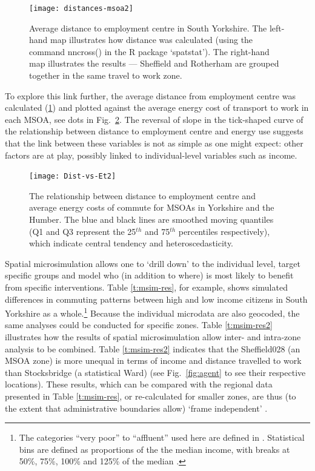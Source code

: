 \begin{figure}
\begin{center}
  \texttt{[image: distances-msoa2]}
\end{center}
\caption[Average distance to employment centre in South Yorkshire]{Average
distance to employment centre in South Yorkshire. The
left-hand map illustrates how distance was calculated (using the command
 nncross() in the R package `spatstat'). The right-hand map illustrates
the results --- Sheffield and Rotherham are grouped together in the same
travel to work zone.}
\label{fig:dis-msoa}
\end{figure}

To explore this link further, the average distance from employment
centre
was calculated (\ref{fig:dis-msoa})
and plotted against the average energy cost of transport to work in each MSOA,
see dots in Fig.~\ref{fig:dis-e}. The reversal of slope in the
tick-shaped curve of the relationship between distance to employment centre and
energy use suggests that the link between these variables is not as simple as
one might expect: other factors are at play, possibly linked to
individual-level variables such as income.

\begin{figure}[h*]
 \centering
\texttt{[image: Dist-vs-Et2]}
 \caption[Scatter plot of distance vs energy costs in Yorkshire and the Humber]
 {The relationship between distance to employment centre and average
energy costs of commute for MSOAs in Yorkshire and the Humber. The blue and
black lines are smoothed moving quantiles (Q1 and Q3 represent the 25$^{th}$ and 75$^{th}$
percentiles respectively), which indicate central tendency and heteroscedasticity.}
 \label{fig:dis-e}
\end{figure}

Spatial microsimulation allows one to `drill down' to the individual
level, target specific groups and model who (in addition to where) is most
likely to benefit from specific interventions. Table \ref{t:msim-res}, for
example, shows simulated differences in commuting patterns between high
and low income citizens in South Yorkshire as a whole.\footnote{The categories
``very poor'' to ``affluent'' used here are defined in \citep{Ballas2005b}.
Statistical bins are defined as proportions of the the median income, with
breaks at 50\%, 75\%, 100\% and 125\% of the median \citep[p.~91]{Ballas2005b}.}
Because the individual
microdata are also geocoded, the same analyses could be conducted for
specific zones.
Table \ref{t:msim-res2} illustrates how the results of spatial microsimulation
allow inter- and intra-zone analysis to be combined. Table \ref{t:msim-res2}
indicates that the Sheffield028 (an MSOA zone) is more unequal in terms of
income and distance travelled to work than Stocksbridge (a statistical Ward)
(see Fig.~\ref{fig:agent} to see their respective locations).
These results, which can be compared with the regional data presented
in Table \ref{t:msim-res}, or re-calculated for smaller zones, are thus
(to the extent that administrative boundaries allow)
`frame independent' \citep{Horner2002}.

